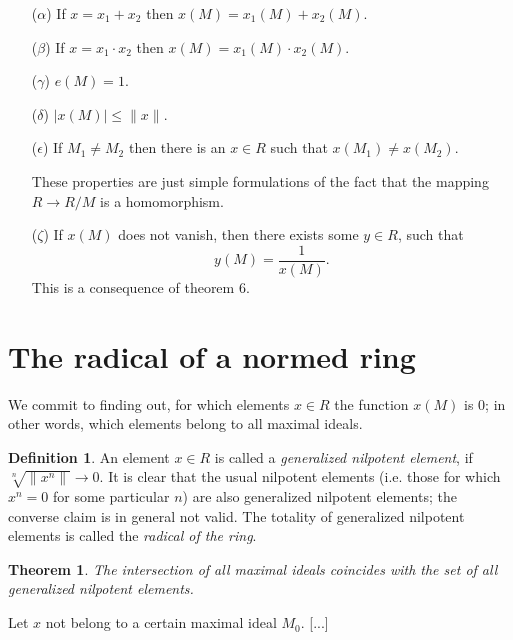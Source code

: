 \documentclass{article}
\newtheorem{theorem}{Theorem}
\theoremstyle{definition}
\newtheorem*{definition}{Definition}
\begin{document}
\begin{enumerate}
\item [($\alpha$)] If $x=x_1+x_2$ then $x(M)=x_1(M)+x_2(M)$.
\item [($\beta$)] If $x=x_1\cdot x_2$ then $x(M)=x_1(M)\cdot x_2(M)$.
\item [($\gamma$)] $e(M)=1$.
\item [($\delta$)] $|x(M)| \leq \|x\|$.
\item [($\epsilon$)] If $M_1\neq M_2$ then there is an $x\in R$ such that $x(M_1)\neq x(M_2)$.

  These properties are just simple formulations of the fact that the mapping $R\to R/M$ is a homomorphism.
\item [($\zeta$)] If $x(M)$ does not vanish, then there exists some $y\in R$, such that $$ y(M) = \frac1{x(M)}.$$ This is a consequence of theorem 6.
\end{enumerate}

\section{The radical of a normed ring}
We commit to finding out, for which elements $x\in R$ the function $x(M)$ is 0; in other words, which elements belong to all maximal ideals.

\begin{definition}
  An element $x\in R$ is called a \emph{generalized nilpotent element}, if $\sqrt[n]{\|x^n\|} \to 0$. It is clear that the usual nilpotent elements (i.e. those for which $x^n = 0$ for some particular $n$) are also generalized nilpotent elements; the converse claim is in general not valid. The totality of generalized nilpotent elements is called the \emph{radical of the ring}.
\end{definition}

\begin{theorem}
  The intersection of all maximal ideals coincides with the set of all generalized nilpotent elements.
\end{theorem}

Let $x$ not belong to a certain maximal ideal $M_0$. [...]
\end{document}
